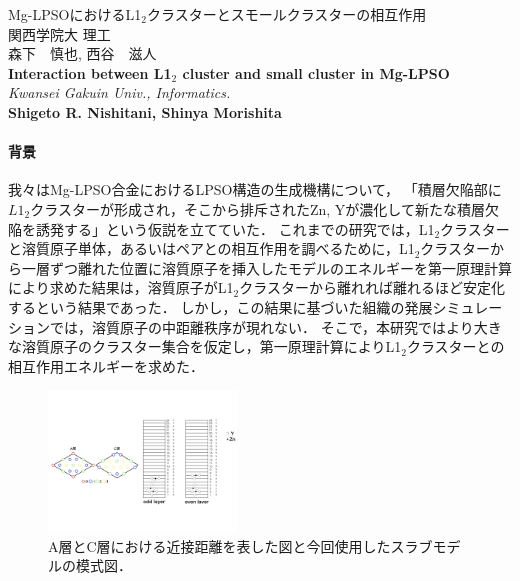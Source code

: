 \documentclass[12pt,a4paper,dvipdfmx]{jsarticle}
\begin{document}
\vspace{-5pt}
\begin{center}
{\gt \Large Mg-LPSOにおけるL1$_2$クラスターとスモールクラスターの相互作用}\\[10pt]

{\gt \large 関西学院大 理工 \\森下　慎也, 西谷　滋人}\\[5pt]

{\large \bf Interaction between L1$_2$ cluster and small cluster in Mg-LPSO}\\[5pt]

{\large \it Kwansei Gakuin Univ., Informatics.}\\ 

{\large \bf Shigeto R. Nishitani, Shinya Morishita}
\end{center}

\vspace{10pt}
\paragraph{背景}
我々はMg-LPSO合金におけるLPSO構造の生成機構について，
「積層欠陥部に$L1_2$クラスターが形成され，そこから排斥されたZn, Yが濃化して新たな積層欠陥を誘発する」という仮説を立てていた\cite{sakamoto}．
これまでの研究では，L1$_2$クラスターと溶質原子単体，あるいはペアとの相互作用を調べるために，L1$_2$クラスターから一層ずつ離れた位置に溶質原子を挿入したモデルのエネルギーを第一原理計算により求めた結果は，溶質原子がL1$_2$クラスターから離れれば離れるほど安定化するという結果であった．
しかし，この結果に基づいた組織の発展シミュレーションでは，溶質原子の中距離秩序が現れない．
そこで，本研究ではより大きな溶質原子のクラスター集合を仮定し，第一原理計算によりL1$_2$クラスターとの相互作用エネルギーを求めた．
\begin{figure}
\vspace{-1.4\baselineskip}
\begin{center}
   \includegraphics[width=50mm]{slab24_color.jpeg}
  \caption{A層とC層における近接距離を表した図と今回使用したスラブモデルの模式図．}
  \label{fig:one}
\end{center}
\vspace{-1\baselineskip}
\end{figure}
\vspace{-1\baselineskip}
\end{document}
